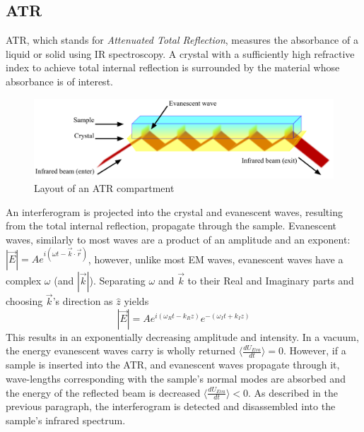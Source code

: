 \documentclass[reprint,amsmath,amssymb,aps, prl,superscriptaddress]{revtex4-2}
\begin{document}
\subsection{ATR}
ATR, which stands for \emph{Attenuated Total Reflection}, measures the absorbance of a liquid or solid using IR spectroscopy. A crystal with a sufficiently high refractive index to achieve total internal reflection is surrounded by the material whose absorbance is of interest. 
\begin{figure}[H]
    \includegraphics[width=\linewidth]{Images/ATR.png}
    \caption{Layout of an ATR compartment \cite{wiki:ATR}}
    \label{fig:ATR}
    \centering
\end{figure}
An interferogram is projected into the crystal and evanescent waves, resulting from the total internal reflection, propagate through the sample. 
Evanescent waves, similarly to most waves are a product of an amplitude and an exponent: $|\vec{E}|=Ae^{i(\omega t - \vec{k}\cdot\vec{r})}$, however, unlike most EM waves, evanescent waves have a complex $\omega$ (and $|\vec{k}|$). Separating $\omega$ and $\vec{k}$ to their Real and Imaginary parts and choosing $\vec{k}$'s direction as $\hat{z}$ yields
\begin{equation}
    |\vec{E}|=Ae^{i(\omega_R t - k_{R}z)}e^{-(\omega_I t + k_{I}z)}
\end{equation}
This results in an exponentially decreasing amplitude and intensity.
In a vacuum, the energy evanescent waves carry is wholly returned $\langle\frac{dU_{Eva}}{dt}\rangle=0$. However, if a sample is inserted into the ATR, and evanescent waves propagate through it, wave-lengths corresponding with the sample's normal modes are absorbed and the energy of the reflected beam is decreased $\langle\frac{dU_{Eva}}{dt}\rangle<0$. As described in the previous paragraph, the interferogram is detected and disassembled into the sample's infrared spectrum.
\end{document}
